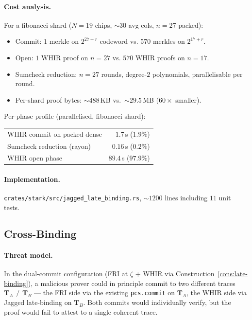 \paragraph{Cost analysis.}  For a fibonacci shard ($N = 19$ chips,
$\sim 30$ avg cols, $n = 27$ packed):
\begin{itemize}
  \item Commit: $1$ merkle on $2^{27+r}$ codeword vs.
        $570$ merkles on $2^{17+r}$.
  \item Open: $1$ WHIR proof on $n=27$ vs. $570$ WHIR proofs on $n=17$.
  \item Sumcheck reduction: $n = 27$ rounds, degree-$2$
        polynomials, parallelisable per round.
  \item Per-shard proof bytes: $\sim 488$\,KB vs.~$\sim 29.5$\,MB
        ($60\times$ smaller).
\end{itemize}

Per-phase profile (parallelised, fibonacci shard):
\begin{tabular}{lr}
\toprule
WHIR commit on packed dense  & $1.7$\,s ($1.9\%$) \\
Sumcheck reduction (rayon)   & $0.16$\,s ($0.2\%$) \\
WHIR open phase              & $89.4$\,s ($97.9\%$) \\
\bottomrule
\end{tabular}

\paragraph{Implementation.}
\texttt{crates/stark/src/jagged\_late\_binding.rs}, $\sim 1200$ lines
including $11$ unit tests.

\subsection{Cross-Binding}
\label{sec:design-cross-binding}

\paragraph{Threat model.}  In the dual-commit configuration (FRI at
$\zeta$ + WHIR via Construction~\ref{cons:late-binding}), a
malicious prover could in principle commit to two different traces
$\mathbf{T}_A \neq \mathbf{T}_B$ --- the FRI side via the existing
\texttt{pcs.commit} on $\mathbf{T}_A$, the WHIR side via Jagged
late-binding on $\mathbf{T}_B$.  Both commits would individually
verify, but the proof would fail to attest to a single coherent
trace.

